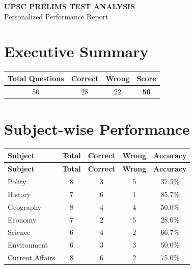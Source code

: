 \documentclass[a4paper,12pt]{article}
\begin{document}
\begin{center}
\vspace*{1cm}
{\Huge\bfseries\color{brandblue} UPSC PRELIMS TEST ANALYSIS}\\[0.5cm]
{\Large\color{darktext} Personalized Performance Report}\\[1cm]
\end{center}
\vspace{1cm}
\begin{center}
\end{center}
\vspace{1cm}
\section{Executive Summary}
\begin{center}
\begin{tabular}{|c|c|c|c|}
\hline
\textbf{Total Questions} & \textbf{Correct} & \textbf{Wrong} & \textbf{Score} \\
\hline
50 & 28 & 22 & \textcolor{brandblue}{\textbf{56}} \\
\hline
\end{tabular}
\end{center}
\vspace{0.5cm}
\section{Subject-wise Performance}
\begin{longtable}{|l|c|c|c|c|}
\hline
\textbf{Subject} & \textbf{Total} & \textbf{Correct} & \textbf{Wrong} & \textbf{Accuracy} \\
\hline
\endfirsthead
\hline
\textbf{Subject} & \textbf{Total} & \textbf{Correct} & \textbf{Wrong} & \textbf{Accuracy} \\
\hline
\endhead
Polity & 8 & 3 & 5 & \textcolor{wrongred}{37.5\%} \\
\hline
History & 7 & 6 & 1 & \textcolor{correctgreen}{85.7\%} \\
\hline
Geography & 8 & 4 & 4 & \textcolor{brandgold}{50.0\%} \\
\hline
Economy & 7 & 2 & 5 & \textcolor{wrongred}{28.6\%} \\
\hline
Science & 6 & 4 & 2 & \textcolor{brandgold}{66.7\%} \\
\hline
Environment & 6 & 3 & 3 & \textcolor{brandgold}{50.0\%} \\
\hline
Current Affairs & 8 & 6 & 2 & \textcolor{correctgreen}{75.0\%} \\
\hline
\end{longtable}
\vspace{0.5cm}
\end{document}
